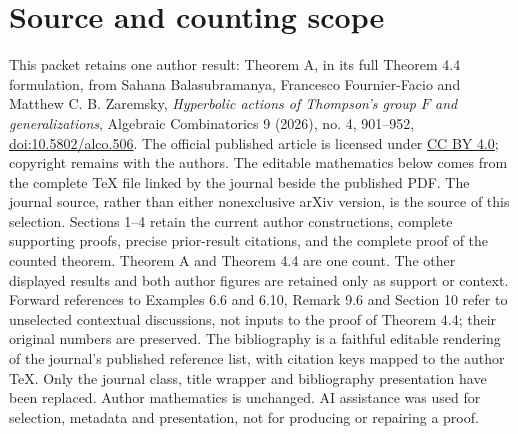 \section*{Source and counting scope}
This packet retains one author result: Theorem A, in its full Theorem 4.4 formulation, from
Sahana Balasubramanya, Francesco Fournier-Facio and Matthew C. B. Zaremsky,
\emph{Hyperbolic actions of Thompson's group $F$ and generalizations},
Algebraic Combinatorics 9 (2026), no. 4, 901--952,
\href{https://doi.org/10.5802/alco.506}{doi:10.5802/alco.506}.
The official published article is licensed under
\href{https://creativecommons.org/licenses/by/4.0/}{CC BY 4.0}; copyright remains with the authors.
The editable mathematics below comes from the complete TeX file linked by the journal beside the published PDF.
The journal source, rather than either nonexclusive arXiv version, is the source of this selection.
Sections 1--4 retain the current author constructions, complete supporting proofs, precise prior-result citations,
and the complete proof of the counted theorem. Theorem A and Theorem 4.4 are one count.
The other displayed results and both author figures are retained only as support or context.
Forward references to Examples 6.6 and 6.10, Remark 9.6 and Section 10 refer to unselected contextual discussions,
not inputs to the proof of Theorem 4.4; their original numbers are preserved.
The bibliography is a faithful editable rendering of the journal's published reference list, with citation keys mapped to the author TeX.
Only the journal class, title wrapper and bibliography presentation have been replaced. Author mathematics is unchanged.
AI assistance was used for selection, metadata and presentation, not for producing or repairing a proof.
